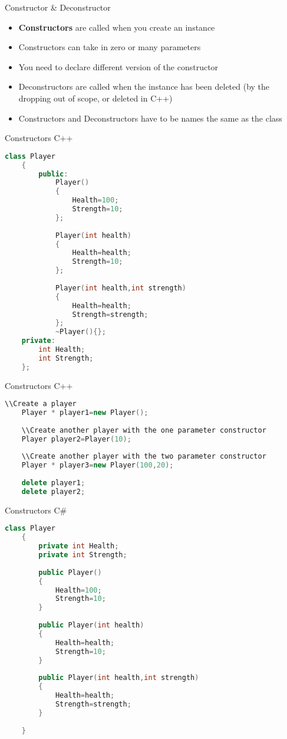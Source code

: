 \begin{frame}{Constructor \& Deconstructor}
	\begin{itemize}
		\pause \item \textbf{Constructors} are called when you create an instance
		\pause \item Constructors can take in zero or many parameters
		\pause \item You need to declare different version of the constructor
		\pause \item Deconstructors are called when the instance has been deleted (by the dropping out of scope, or deleted in C++)
		\pause \item Constructors and Deconstructors have to be names the same as the class
	\end{itemize}
\end{frame}

\begin{frame}[fragile]{Constructors C++}
	\begin{lstlisting}[language=C++,basicstyle=\tiny,]
	class Player
	{
		public:
			Player()
			{
				Health=100;
				Strength=10;
			};
			
			Player(int health)
			{
				Health=health;
				Strength=10;
			};
			
			Player(int health,int strength)
			{
				Health=health;
				Strength=strength;
			};
			~Player(){};
	private:
		int Health;
		int Strength;
	};	
	\end{lstlisting}
\end{frame}

\begin{frame}[fragile]{Constructors C++}
	\begin{lstlisting}[language=C++,basicstyle=\tiny,]
	\\Create a player
	Player * player1=new Player();
	
	\\Create another player with the one parameter constructor
	Player player2=Player(10);
	
	\\Create another player with the two parameter constructor
	Player * player3=new Player(100,20);
	
	delete player1;
	delete player2;
	\end{lstlisting}
\end{frame}

\begin{frame}[fragile]{Constructors C\#}
	\begin{lstlisting}[language=C++,basicstyle=\tiny,]
	class Player
	{
		private int Health;
		private int Strength;
		
		public Player()
		{
			Health=100;
			Strength=10;
		}
		
		public Player(int health)
		{
			Health=health;
			Strength=10;	
		}
		
		public Player(int health,int strength)
		{
			Health=health;
			Strength=strength;
		}
		
	}
	\end{lstlisting}
\end{frame}

